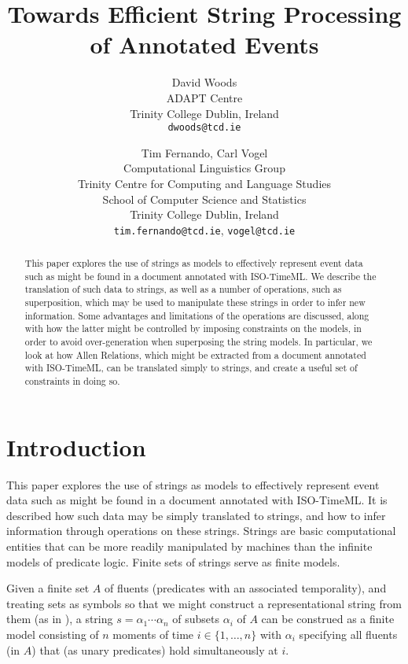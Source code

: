 \documentclass[a4paper,11pt,leqno]{article}
\title{Towards Efficient String Processing of Annotated Events}
\date{}
\author{David Woods\\
	ADAPT Centre\\
	Trinity College Dublin, Ireland\\
	\texttt{dwoods@tcd.ie}
	\and Tim Fernando, Carl Vogel\\
	Computational Linguistics Group \\
	Trinity Centre for Computing and Language Studies\\
	School of Computer Science and Statistics\\
	Trinity College Dublin, Ireland\\
	\texttt{tim.fernando@tcd.ie}, \texttt{vogel@tcd.ie}
}
\begin{document}
\maketitle
\thispagestyle{empty}
\pagestyle{empty}
\begin{abstract}
\noindent
This paper explores the use of strings as models to effectively represent event 
data such as might be found in a document annotated with ISO-TimeML. We 
describe 
the translation of such data to strings, as well as a number of operations, 
such as superposition, which may be used to manipulate these strings in order 
to infer new information. Some advantages and limitations of the operations are 
discussed, along with how the latter might be controlled by imposing 
constraints on the models, in order to avoid over-generation when superposing 
the string models. In particular, we look at how Allen Relations, which might 
be extracted from a document annotated with ISO-TimeML, can be translated 
simply to 
strings, and create a useful set of constraints in doing so.
\end{abstract}
\section{Introduction}\label{intro}
This paper explores the use of strings as models to effectively represent event 
data such as might be found in a document annotated with ISO-TimeML. It is 
described how such data may be simply translated to strings, and how to infer 
information through operations on these strings. Strings are basic 
computational entities that can be more readily manipulated by machines than 
the infinite models of predicate logic. Finite sets of strings serve as finite 
models.

Given a finite set $A$ of fluents (predicates with an associated temporality), 
and treating sets as symbols so that we might construct a representational 
string from them (as in \citealp{fernando2016regular}),
a string $s=\alpha_1 \cdots \alpha_n$ of subsets $\alpha_i$ of $A$ can be 
construed as a finite model consisting of $n$ moments of time $i \in \{1, 
\ldots, n\}$ with $\alpha_i$ specifying all fluents (in $A$) that (as unary 
predicates) hold simultaneously at $i$.
\end{document}
